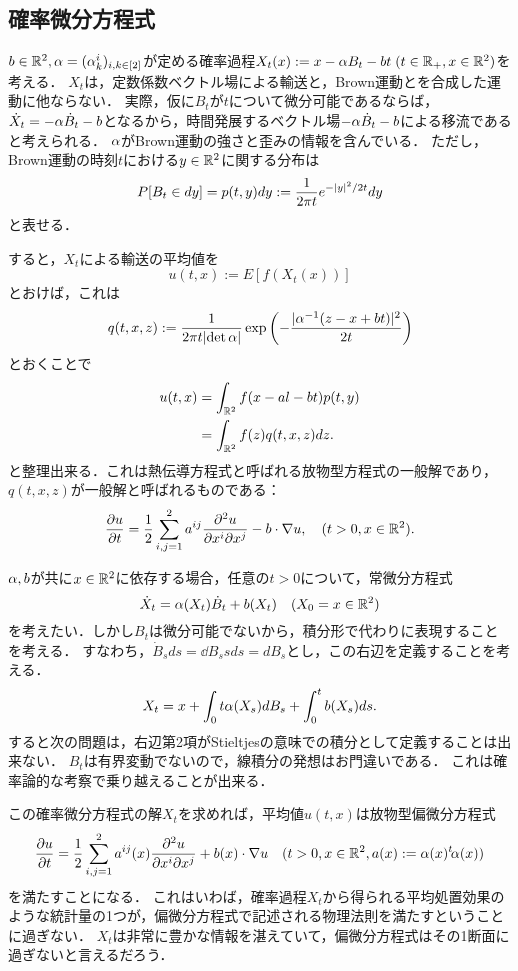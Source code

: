 \documentclass[uplatex,dvipdfmx]{jsreport}
\begin{document}
\subsection{確率微分方程式}

\begin{example}[空間的に一様な場合]
    $b\in\mathbb{R}^2,\alpha=(\alpha^i_k)_{i,k\in[2]}$が定める確率過程$X_t(x):=x-\alpha B_t-bt\;(t\in\mathbb{R}_+,x\in\mathbb{R}^2)$を考える．
    $X_t$は，定数係数ベクトル場による輸送と，Brown運動とを合成した運動に他ならない．
    実際，仮に$B_t$が$t$について微分可能であるならば，$\dot{X}_t=-\alpha\dot{B}_t-b$となるから，時間発展するベクトル場$-\alpha\dot{B}_t-b$による移流であると考えられる．
    $\alpha$がBrown運動の強さと歪みの情報を含んでいる．
    ただし，Brown運動の時刻$t$における$y\in\mathbb{R}^2$に関する分布は
    \[P[B_t\in dy]=p(t,y)dy:=\frac{1}{2\pi t}e^{-\lvert y\rvert^2/2t}dy\]
    と表せる．

    すると，$X_t$による輸送の平均値を
    \[u(t,x):=E[f(X_t(x))]\]
    とおけば，これは
    \[q(t,x,z):=\frac{1}{2\pi t\lvert\det\alpha\rvert}\exp\left(-\frac{\lvert\alpha^{-1}(z-x+bt)\rvert^2}{2t}\right)\]
    とおくことで
    \begin{align*}
        u(t,x)&=\int_{\mathbb{R}^2}f(x-al-bt)p(t,y)\\
        &=\int_{\mathbb{R}^2}f(z)q(t,x,z)dz.
    \end{align*}
    と整理出来る．これは熱伝導方程式と呼ばれる放物型方程式の一般解であり，$q(t,x,z)$が一般解と呼ばれるものである：
    \[\frac{\partial u}{\partial t}=\frac{1}{2}\sum^2_{i,j=1}a^{ij}\frac{\partial ^2u}{\partial x^i\partial x^j}-b\cdot\nabla u,\quad(t>0,x\in\mathbb{R}^2).\]
\end{example}

\begin{example}[変数係数の場合]
    $\alpha,b$が共に$x\in\mathbb{R}^2$に依存する場合，任意の$t>0$について，常微分方程式
    \[\dot{X}_t=\alpha(X_t)\dot{B}_t+b(X_t)\quad(X_0=x\in\mathbb{R}^2)\]
    を考えたい．しかし$B_t$は微分可能でないから，積分形で代わりに表現することを考える．
    すなわち，$\dot{B}_sds=\dd{B_s}{s}ds=dB_s$とし，この右辺を定義することを考える．
    \[X_t=x+\int_0t\alpha(X_s)dB_s+\int^t_0b(X_s)ds.\]
    すると次の問題は，右辺第2項がStieltjesの意味での積分として定義することは出来ない．
    $B_t$は有界変動でないので，線積分の発想はお門違いである．
    これは確率論的な考察で乗り越えることが出来る．

    この確率微分方程式の解$X_t$を求めれば，平均値$u(t,x)$は放物型偏微分方程式
    \[\frac{\partial u}{\partial t}=\frac{1}{2}\sum^2_{i,j=1}a^{ij}(x)\frac{\partial ^2u}{\partial x^i\partial x^j}+b(x)\cdot\nabla u\quad(t>0,x\in\mathbb{R}^2,a(x):=\alpha(x){}^t\!\alpha(x))\]
    を満たすことになる．
    これはいわば，確率過程$X_t$から得られる平均処置効果のような統計量の1つが，偏微分方程式で記述される物理法則を満たすということに過ぎない．
    $X_t$は非常に豊かな情報を湛えていて，偏微分方程式はその1断面に過ぎないと言えるだろう．
\end{example}
\end{document}
